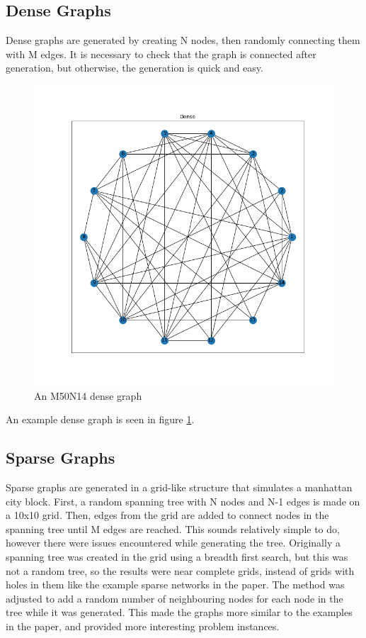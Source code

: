 \documentclass{article}
\begin{document}
\subsection{Dense Graphs}
Dense graphs are generated by creating N nodes, then randomly connecting them with M edges. It is necessary to check that the graph is connected after generation, but otherwise, the generation is quick and easy.

\begin{figure}[h]
    \includegraphics[width=\textwidth]{dense}
    \caption{An M50N14 dense graph}
    \label{fig:dense}
\end{figure}

An example dense graph is seen in figure \ref{fig:dense}.

\newpage
\subsection{Sparse Graphs}
Sparse graphs are generated in a grid-like structure that simulates a manhattan city block. First, a random spanning tree with N nodes and N-1 edges is made on a 10x10 grid. Then, edges from the grid are added to connect nodes in the spanning tree until M edges are reached. This sounds relatively simple to do, however there were issues encountered while generating the tree. 
Originally a spanning tree was created in the grid using a breadth first search, but this was not a random tree, so the results were near complete grids, instead of grids with holes in them like the example sparse networks in the paper. The method was adjusted to add a random number of neighbouring nodes for each node in the tree while it was generated. This made the graphs more similar to the examples in the paper, and provided more interesting problem instances. 
\end{document}

